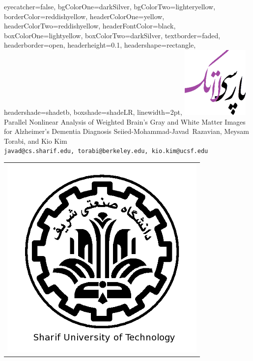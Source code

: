 \documentclass[portrait]{xebaposter}
\begin{document}
      \begin{poster}%
      {
      eyecatcher=false,
      bgColorOne=darkSilver,
      bgColorTwo=lighteryellow,
      borderColor=reddishyellow,
      headerColorOne=yellow,
      headerColorTwo=reddishyellow,
      headerFontColor=black,
      boxColorOne=lightyellow,
      boxColorTwo=darkSilver,
      textborder=faded,
      headerborder=open,
      headerheight=0.1\textheight,
      headershape=rectangle,
      headershade=shadetb,
      boxshade=shadeLR,
      linewidth=2pt,
      }
 {
      \includegraphics[width=0.08\linewidth]{logo}
 }
 {Parallel Nonlinear Analysis of Weighted Brain's Gray and White Matter Images for Alzheimer's Dementia Diagnosis}
 {\large Seiied-Mohammad-Javad~Razavian, Meysam Torabi, and Kio Kim \\%
 {\normalsize\texttt{javad@cs.sharif.edu, torabi@berkeley.edu, kio.kim@ucsf.edu}}}
 {
\begin{tabular}{r}
    \includegraphics[height=0.07 \textheight]{shariflogo}\\
\end{tabular}
 }


\end{poster}
\end{document}
